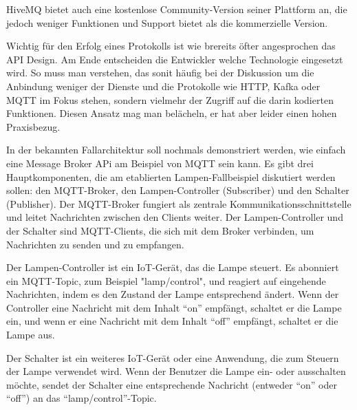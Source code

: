 HiveMQ bietet auch eine kostenlose Community-Version seiner Plattform an, die jedoch weniger Funktionen und Support bietet als die kommerzielle Version. 

Wichtig für den Erfolg eines Protokolls ist wie brereits öfter angesprochen das API Design. Am Ende entscheiden die Entwickler welche Technologie eingesetzt wird. So muss man verstehen, das sonit häufig bei der Diskussion um die Anbindung weniger der Dienste und  die Protokolle wie HTTP, Kafka oder MQTT im Fokus stehen, sondern vielmehr der Zugriff auf die darin kodierten Funktionen. Diesen Ansatz mag man belächeln, er hat aber leider einen hohen Praxisbezug.  

In der bekannten Fallarchitektur soll nochmals demonstriert werden, wie einfach eine Message Broker APi am Beispiel von MQTT sein kann. Es gibt drei Hauptkomponenten, die am etablierten Lampen-Fallbeispiel diskutiert werden sollen: den MQTT-Broker, den Lampen-Controller (Subscriber) und den Schalter (Publisher). Der MQTT-Broker fungiert als zentrale Kommunikationsschnittstelle und leitet Nachrichten zwischen den Clients weiter. Der Lampen-Controller und der Schalter sind MQTT-Clients, die sich mit dem Broker verbinden, um Nachrichten zu senden und zu empfangen.

Der Lampen-Controller ist ein IoT-Gerät, das die Lampe steuert. Es abonniert ein MQTT-Topic, zum Beispiel "lamp/control", und reagiert auf eingehende Nachrichten, indem es den Zustand der Lampe entsprechend ändert. Wenn der Controller eine Nachricht mit dem Inhalt \enquote{on} empfängt, schaltet er die Lampe ein, und wenn er eine Nachricht mit dem Inhalt \enquote{off} empfängt, schaltet er die Lampe aus.

Der Schalter ist ein weiteres IoT-Gerät oder eine Anwendung, die zum Steuern der Lampe verwendet wird. Wenn der Benutzer die Lampe ein- oder ausschalten möchte, sendet der Schalter eine entsprechende Nachricht (entweder \enquote{on} oder \enquote{off}) an das \enquote{lamp/control}-Topic.

